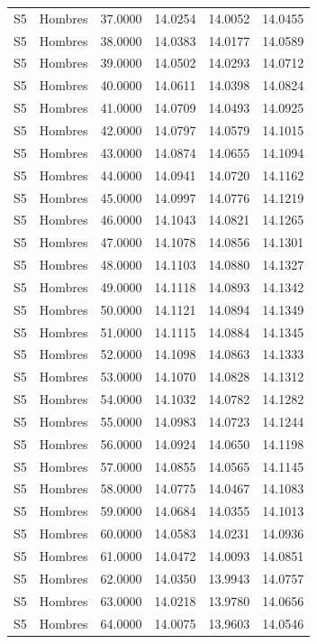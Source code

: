 \begin{longtable}{llrrrr}
S5 & Hombres & 37.0000 & 14.0254 & 14.0052 & 14.0455 \\
S5 & Hombres & 38.0000 & 14.0383 & 14.0177 & 14.0589 \\
S5 & Hombres & 39.0000 & 14.0502 & 14.0293 & 14.0712 \\
S5 & Hombres & 40.0000 & 14.0611 & 14.0398 & 14.0824 \\
S5 & Hombres & 41.0000 & 14.0709 & 14.0493 & 14.0925 \\
S5 & Hombres & 42.0000 & 14.0797 & 14.0579 & 14.1015 \\
S5 & Hombres & 43.0000 & 14.0874 & 14.0655 & 14.1094 \\
S5 & Hombres & 44.0000 & 14.0941 & 14.0720 & 14.1162 \\
S5 & Hombres & 45.0000 & 14.0997 & 14.0776 & 14.1219 \\
S5 & Hombres & 46.0000 & 14.1043 & 14.0821 & 14.1265 \\
S5 & Hombres & 47.0000 & 14.1078 & 14.0856 & 14.1301 \\
S5 & Hombres & 48.0000 & 14.1103 & 14.0880 & 14.1327 \\
S5 & Hombres & 49.0000 & 14.1118 & 14.0893 & 14.1342 \\
S5 & Hombres & 50.0000 & 14.1121 & 14.0894 & 14.1349 \\
S5 & Hombres & 51.0000 & 14.1115 & 14.0884 & 14.1345 \\
S5 & Hombres & 52.0000 & 14.1098 & 14.0863 & 14.1333 \\
S5 & Hombres & 53.0000 & 14.1070 & 14.0828 & 14.1312 \\
S5 & Hombres & 54.0000 & 14.1032 & 14.0782 & 14.1282 \\
S5 & Hombres & 55.0000 & 14.0983 & 14.0723 & 14.1244 \\
S5 & Hombres & 56.0000 & 14.0924 & 14.0650 & 14.1198 \\
S5 & Hombres & 57.0000 & 14.0855 & 14.0565 & 14.1145 \\
S5 & Hombres & 58.0000 & 14.0775 & 14.0467 & 14.1083 \\
S5 & Hombres & 59.0000 & 14.0684 & 14.0355 & 14.1013 \\
S5 & Hombres & 60.0000 & 14.0583 & 14.0231 & 14.0936 \\
S5 & Hombres & 61.0000 & 14.0472 & 14.0093 & 14.0851 \\
S5 & Hombres & 62.0000 & 14.0350 & 13.9943 & 14.0757 \\
S5 & Hombres & 63.0000 & 14.0218 & 13.9780 & 14.0656 \\
S5 & Hombres & 64.0000 & 14.0075 & 13.9603 & 14.0546 \\

\end{longtable}
